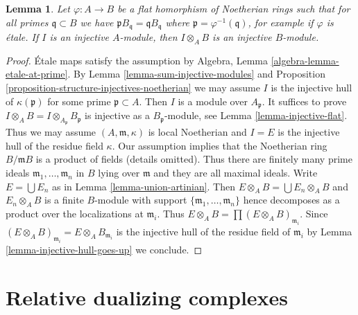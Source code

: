 \documentclass{stacks-project}
\theoremstyle{plain}
\newtheorem{lemma}[subsection]{Lemma}
\theoremstyle{definition}
\theoremstyle{remark}
\numberwithin{equation}{subsection}
\begin{document}
\begin{lemma}
\label{lemma-injective-goes-up}
Let $\varphi : A \to B$ be a flat homorphism of Noetherian rings such
that for all primes $\mathfrak q \subset B$ we have
$\mathfrak p B_\mathfrak q = \mathfrak qB_\mathfrak q$
where $\mathfrak p = \varphi^{-1}(\mathfrak q)$, for example
if $\varphi$ is \'etale.
If $I$ is an injective $A$-module, then $I \otimes_A B$ is
an injective $B$-module.
\end{lemma}

\begin{proof}
\'Etale maps satisfy the assumption by
Algebra, Lemma \ref{algebra-lemma-etale-at-prime}.
By Lemma \ref{lemma-sum-injective-modules} and
Proposition \ref{proposition-structure-injectives-noetherian}
we may assume $I$ is the injective hull of $\kappa(\mathfrak p)$
for some prime $\mathfrak p \subset A$.
Then $I$ is a module over $A_\mathfrak p$.
It suffices to prove $I \otimes_A B = I \otimes_{A_\mathfrak p} B_\mathfrak p$
is injective as a $B_\mathfrak p$-module, see
Lemma \ref{lemma-injective-flat}.
Thus we may assume $(A, \mathfrak m, \kappa)$ is local Noetherian
and $I = E$ is the injective hull of the residue field $\kappa$.
Our assumption implies that the Noetherian ring $B/\mathfrak m B$
is a product of fields (details omitted).
Thus there are finitely many prime ideals
$\mathfrak m_1, \ldots, \mathfrak m_n$ in $B$
lying over $\mathfrak m$ and they are all maximal ideals.
Write $E = \bigcup E_n$ as in Lemma \ref{lemma-union-artinian}.
Then $E \otimes_A B = \bigcup E_n \otimes_A B$
and $E_n \otimes_A B$ is a finite $B$-module with support
$\{\mathfrak m_1, \ldots, \mathfrak m_n\}$ hence decomposes
as a product over the localizations at $\mathfrak m_i$.
Thus $E \otimes_A B = \prod (E \otimes_A B)_{\mathfrak m_i}$.
Since $(E \otimes_A B)_{\mathfrak m_i} = E \otimes_A B_{\mathfrak m_i}$
is the injective hull of the residue field of $\mathfrak m_i$
by Lemma \ref{lemma-injective-hull-goes-up} we conclude.
\end{proof}






\section{Relative dualizing complexes}
\label{section-relative-dualizing-complexes}
\end{document}
